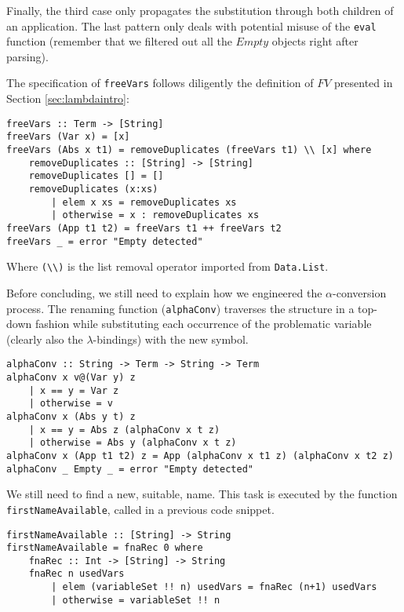 \documentclass{article}
\begin{document}
Finally, the third case only propagates the substitution through both children of an application. The last pattern only deals with potential misuse of the \lstinline|eval| function (remember that we filtered out all the $Empty$ objects right after parsing).

The specification of \lstinline|freeVars| follows diligently the definition of $FV$ presented in Section \ref{sec:lambdaintro}:

\begin{lstlisting}
freeVars :: Term -> [String]
freeVars (Var x) = [x]
freeVars (Abs x t1) = removeDuplicates (freeVars t1) \\ [x] where
    removeDuplicates :: [String] -> [String]
    removeDuplicates [] = []
    removeDuplicates (x:xs)
        | elem x xs = removeDuplicates xs
        | otherwise = x : removeDuplicates xs
freeVars (App t1 t2) = freeVars t1 ++ freeVars t2
freeVars _ = error "Empty detected"
\end{lstlisting}

Where \lstinline|(\\)| is the list removal operator imported from \lstinline|Data.List|.

Before concluding, we still need to explain how we engineered the $\alpha$-conversion process. The renaming function (\lstinline|alphaConv|) traverses the structure in a top-down fashion while substituting each occurrence of the problematic variable (clearly also the $\lambda$-bindings) with the new symbol.

\begin{lstlisting}
alphaConv :: String -> Term -> String -> Term
alphaConv x v@(Var y) z
    | x == y = Var z
    | otherwise = v
alphaConv x (Abs y t) z
    | x == y = Abs z (alphaConv x t z)
    | otherwise = Abs y (alphaConv x t z)
alphaConv x (App t1 t2) z = App (alphaConv x t1 z) (alphaConv x t2 z)
alphaConv _ Empty _ = error "Empty detected"
\end{lstlisting}

We still need to find a new, suitable, name. This task is executed by the function \lstinline|firstNameAvailable|, called in a previous code snippet.

\begin{lstlisting}
firstNameAvailable :: [String] -> String
firstNameAvailable = fnaRec 0 where
    fnaRec :: Int -> [String] -> String
    fnaRec n usedVars
        | elem (variableSet !! n) usedVars = fnaRec (n+1) usedVars
        | otherwise = variableSet !! n
\end{lstlisting}
\end{document}
